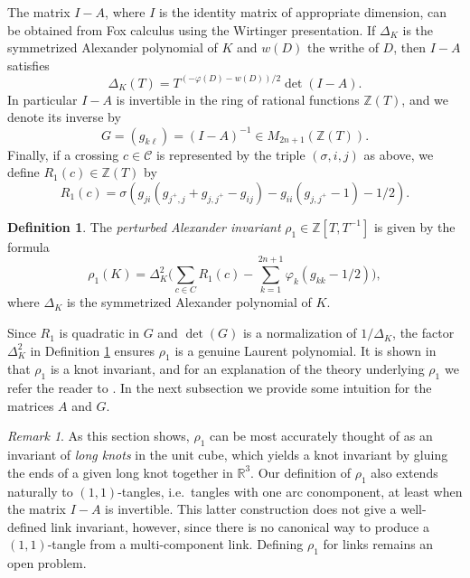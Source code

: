 \documentclass[11pt,hyp,]{nyjm}
\newcommand{\Z}{\mathbb{Z}}
\newcommand{\R}{\mathbb{R}}
\numberwithin{thm}{section}
\theoremstyle{definition}
\newtheorem{defn}[thm]{Definition}
\theoremstyle{remark}
\newtheorem{rmk}[thm]{Remark}
\begin{document}
	The matrix $I - A$, where $I$ is the identity matrix of appropriate dimension, can be obtained from Fox calculus using the Wirtinger presentation. If $\Delta_K$ is the symmetrized Alexander polynomial of $K$ and $w(D)$ the writhe of $D$, then $I - A$ satisfies
	\begin{equation}
		\label{eq:alex}
		\Delta_K(T) = T^{(-\varphi(D) - w(D))/2}\det(I - A).
	\end{equation}
	In particular $I - A$ is invertible in the ring of rational functions $\Z(T)$, and we denote its inverse by
	$$
	G = (g_{k\ell}) = (I - A)^{-1} \in M_{2n + 1}(\Z(T)).
	$$
	Finally, if a crossing $c \in \mathcal{C}$ is represented by the triple $(\sigma, i, j)$ as above, we define $R_1(c) \in \Z(T)$ by
	\begin{equation}
		\label{eq:r}
		R_1(c) = \sigma(g_{ji}(g_{j^+, j} + g_{j, j^+} - g_{ij}) - g_{ii}(g_{j,j^+} - 1) - 1/2).
	\end{equation}
	
	\begin{defn}{\protect\cite{bnvdv22}}
		\label{def:rho}
		The {\em perturbed Alexander invariant} $\rho_1 \in \Z[T,T^{-1}]$ is given by the formula
		$$
		\rho_1(K) = \Delta_K^2 \Big( \sum_{c \in C} R_1(c) - \sum_{k = 1}^{2n + 1} \varphi_k (g_{kk} - 1/2) \Big),
		$$
		where $\Delta_K$ is the symmetrized Alexander polynomial of $K$.
	\end{defn}

	Since $R_1$ is quadratic in $G$ and $\det(G)$ is a normalization of $1/\Delta_K$, the factor $\Delta_K^2$ in Definition \ref{def:rho} ensures $\rho_1$ is a genuine Laurent polynomial. It is shown in \cite{bnvdv22} that $\rho_1$ is a knot invariant, and for an explanation of the theory underlying $\rho_1$ we refer the reader to \cite{bnvdv21}. In the next subsection we provide some intuition for the matrices $A$ and $G$.
	
	\begin{rmk}
		As this section shows, $\rho_1$ can be most accurately thought of as an invariant of {\em long knots} in the unit cube, which yields a knot invariant by gluing the ends of a given long knot together in $\R^3$. Our definition of $\rho_1$ also extends naturally to $(1,1)$-tangles, i.e.~tangles with one arc conomponent, at least when the matrix $I - A$ is invertible. This latter construction does not give a well-defined link invariant, however, since there is no canonical way to produce a $(1,1)$-tangle from a multi-component link. Defining $\rho_1$ for links remains an open problem.
	\end{rmk}
	
\end{document}
